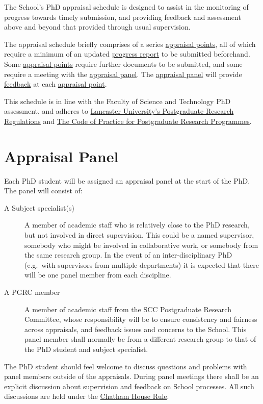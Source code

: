 The School's PhD appraisal schedule is designed to assist in the monitoring of progress towards timely submission, and providing feedback and assessment above and beyond that provided through usual supervision.

The appraisal schedule briefly comprises of a series \hyperref[sec:points]{appraisal points}, all of which require a minimum of an updated \hyperref[sec:report]{progress report} to be submitted beforehand. Some \hyperref[sec:points]{appraisal points} require further documents to be submitted, and some require a meeting with the \hyperref[sec:panel]{appraisal panel}. The \hyperref[sec:panel]{appraisal panel} will provide \hyperref[sec:feedback]{feedback} at each \hyperref[sec:points]{appraisal point}.

This schedule is in line with the Faculty of Science and Technology PhD assessment, and adheres to
\href{https://gap.lancs.ac.uk/ASQ/QAE/MARP/Documents/PGR-Regs.pdf}{Lancaster University's Postgraduate Research Regulations} and 
\href{https://gap.lancs.ac.uk/ASQ/Policies/Documents/Postgraduate-Research-Code-of-Practice.pdf}{The Code of Practice for Postgraduate Research Programmes}.

\section{Appraisal Panel} \label{sec:panel}
Each PhD student will be assigned an appraisal panel at the start of the PhD. The panel will consist of:
\begin{description}
	\item[A Subject specialist(s)] A member of academic staff who is relatively close to the PhD research, but not involved in direct supervision. This could be a named supervisor, somebody who might be involved in collaborative work, or somebody from the same research group. In the event of an inter-disciplinary PhD (e.g.\ with supervisors from multiple departments) it is expected that there will be one panel member from each discipline.
	\item[A PGRC member] A member of academic staff from the SCC Postgraduate Research Committee, whose responsibility will be to ensure consistency and fairness across appraisals, and feedback issues and concerns to the School. This panel member shall normally be from a different research group to that of the PhD student and subject specialist.
\end{description}

The PhD student should feel welcome to discuss questions and problems with panel members outside of the appraisals. During panel meetings there shall be an explicit discussion about supervision and feedback on School processes. All such discussions are held under the \href{https://www.chathamhouse.org/chatham-house-rule}{Chatham House Rule}.

